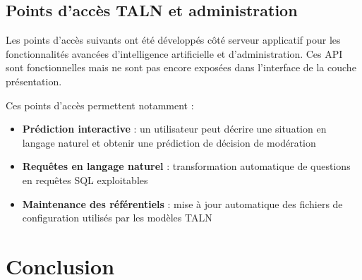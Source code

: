 \documentclass[10pt,twocolumn,a4paper]{article}
\begin{document}
\subsection{Points d'accès TALN et administration}

Les points d'accès suivants ont été développés côté serveur applicatif pour les fonctionnalités avancées d'intelligence artificielle et d'administration. Ces API sont fonctionnelles mais ne sont pas encore exposées dans l'interface de la couche présentation.

\vspace{0.3cm}
\noindent
{}
\label{tab:api_nlp_admin}
\vspace{0.3cm}

Ces points d'accès permettent notamment :
\begin{itemize}
    \item \textbf{Prédiction interactive} : un utilisateur peut décrire une situation en langage naturel et obtenir une prédiction de décision de modération
    \item \textbf{Requêtes en langage naturel} : transformation automatique de questions en requêtes SQL exploitables
    \item \textbf{Maintenance des référentiels} : mise à jour automatique des fichiers de configuration utilisés par les modèles TALN
\end{itemize}


\section{Conclusion}
\end{document}
